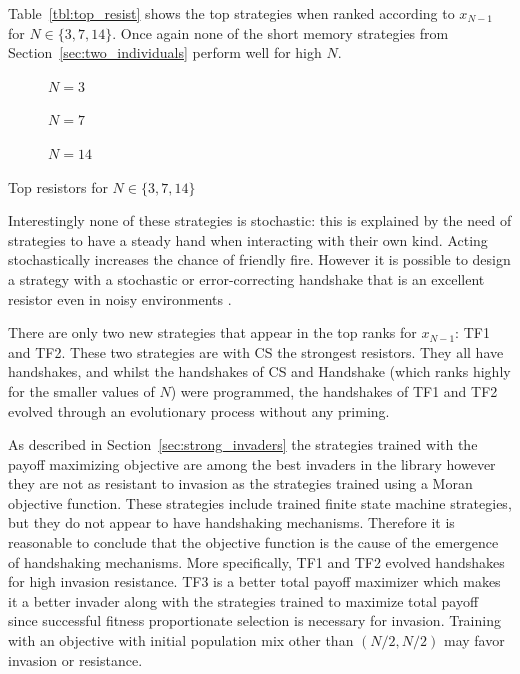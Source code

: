 \documentclass[10pt,journal]{IEEEtran}
\begin{document}
Table~\ref{tbl:top_resist} shows the top strategies when ranked
according to \(x_{N-1}\) for \(N\in\{3, 7, 14\}\).
Once again none of the short memory strategies from
Section~\ref{sec:two_individuals} perform well for high \(N\).

\begin{table}[!hbtp]
    \scriptsize
    \centering
    \begin{subfigure}[t]{\columnwidth}
        \centering
        
        \caption{\(N=3\)}
    \end{subfigure}%

    \begin{subfigure}[t]{\columnwidth}
        \centering
        
        \caption{\(N=7\)}
    \end{subfigure}

    \begin{subfigure}[t]{\columnwidth}
        \centering
        
        \caption{\(N=14\)}
    \end{subfigure}
    \caption{Top resistors for \(N\in\{3, 7, 14\}\)}
    \label{tbl:top_resist}
\end{table}

Interestingly none of these strategies is stochastic: this is explained by
the need of strategies to have a steady hand when interacting with their own
kind. Acting stochastically increases the chance of friendly fire.
However it is possible to design a strategy with a stochastic or error-correcting
handshake that is an excellent resistor even in noisy environments \cite{Lee2015}.

There are only two new strategies that appear in the top ranks for
\(x_{N-1}\): TF1 and TF2. These two strategies are with CS the strongest
resistors. They all have handshakes, and whilst the handshakes of CS and
Handshake (which ranks highly for the smaller values of \(N\)) were
programmed, the handshakes of TF1 and TF2 evolved through an evolutionary
process without any priming.

As described in Section~\ref{sec:strong_invaders} the strategies trained with
the payoff maximizing objective are among the best invaders in the library
however they are not as resistant to invasion as the strategies trained using a
Moran objective function. These strategies include trained finite state machine
strategies, but they do not appear to have handshaking mechanisms. Therefore it
is reasonable to conclude that the objective function is the cause of the
emergence of handshaking mechanisms. More specifically, TF1 and TF2 evolved
handshakes for high invasion resistance. TF3 is a better total payoff maximizer
which makes it a better invader along with the strategies
trained to maximize total payoff since successful fitness proportionate selection
is necessary for invasion. Training with an objective with initial population
mix other than $(N/2, N/2)$ may favor invasion or resistance.
\end{document}
